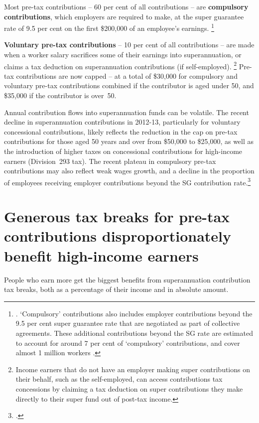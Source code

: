 Most pre-tax contributions – 60 per cent of all contributions – are \textbf{compulsory contributions}, which employers are required to make, at the super guarantee rate of 9.5 per cent on the first \$200,000 of an employee’s earnings.%
\footnote{\textcites{APRA2014}{ATO2015SampleFile1213}{ATO2015MaxSuperContrBase}. `Compulsory' contributions also includes employer contributions beyond the 9.5 per cent super guarantee rate that are negotiated as part of collective agreements. These additional contributions beyond the SG rate are estimated to account for around 7 per cent of ‘compulsory’ contributions, and cover almost 1 million workers \textcite[][16]{Kelly2013}.}  

\textbf{Voluntary pre-tax contributions} – 10 per cent of all contributions – are made when a worker salary sacrifices some of their earnings into superannuation, or claims a tax deduction on superannuation contributions (if self-employed).%
\footnote{Income earners that do not have an employer making super contributions on their behalf, such as the self-employed, can access contributions tax concessions by claiming a tax deduction on super contributions they make directly to their super fund out of post-tax income.}
Pre-tax contributions are now capped – at a total of \$30,000 for compulsory and voluntary pre-tax contributions combined if the contributor is aged under 50, and \$35,000 if the contributor is over~50.

Annual contribution flows into superannuation funds can be volatile. The recent decline in superannuation contributions in 2012-13, particularly for voluntary concessional contributions, likely reflects the reduction in the cap on pre-tax contributions for those aged 50 years and over from \$50,000 to \$25,000, as well as the introduction of higher taxes on concessional contributions for high-income earners (Division~293 tax). The recent plateau in compulsory pre-tax contributions may also reflect weak wages growth, and a decline in the proportion of employees receiving employer contributions beyond the SG contribution rate.\footcite[][15--16]{Kelly2013}

\section{Generous tax breaks for pre-tax contributions disproportionately benefit high-income earners}
People who earn more get the biggest benefits from superannuation contribution tax breaks, both as a percentage of their income and in absolute amount. 

